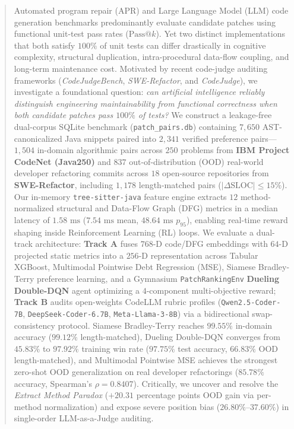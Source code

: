 \documentclass[conference]{IEEEtran}
\begin{document}
\begin{abstract}
Automated program repair (APR) and Large Language Model (LLM) code generation benchmarks predominantly evaluate candidate patches using functional unit-test pass rates ($\text{Pass@}k$). Yet two distinct implementations that both satisfy $100\%$ of unit tests can differ drastically in cognitive complexity, structural duplication, intra-procedural data-flow coupling, and long-term maintenance cost. Motivated by recent code-judge auditing frameworks (\textit{CodeJudgeBench}, \textit{SWE-Refactor}, and \textit{CodeJudge}), we investigate a foundational question: \textit{can artificial intelligence reliably distinguish engineering maintainability from functional correctness when both candidate patches pass $100\%$ of tests?} We construct a leakage-free dual-corpus SQLite benchmark (\texttt{patch\_pairs.db}) containing $7{,}650$ AST-canonicalized Java snippets paired into $2{,}341$ verified preference pairs---$1{,}504$ in-domain algorithmic pairs across $250$ problems from \textbf{IBM Project CodeNet (Java250)} and $837$ out-of-distribution (OOD) real-world developer refactoring commits across $18$ open-source repositories from \textbf{SWE-Refactor}, including $1{,}178$ length-matched pairs ($|\Delta \text{SLOC}| \le 15\%$). Our in-memory \texttt{tree-sitter-java} feature engine extracts $12$ method-normalized structural and Data-Flow Graph (DFG) metrics in a median latency of $1.58\text{ ms}$ ($7.54\text{ ms}$ mean, $48.64\text{ ms}$ $p_{95}$), enabling real-time reward shaping inside Reinforcement Learning (RL) loops. We evaluate a dual-track architecture: \textbf{Track A} fuses $768\text{-D}$ code/DFG embeddings with $64\text{-D}$ projected static metrics into a $256\text{-D}$ representation across Tabular XGBoost, Multimodal Pointwise Debt Regression (MSE), Siamese Bradley-Terry preference learning, and a Gymnasium \texttt{PatchRankingEnv} \textbf{Dueling Double-DQN} agent optimizing a $4$-component multi-objective reward; \textbf{Track B} audits open-weights CodeLLM rubric profiles (\texttt{Qwen2.5-Coder-7B}, \texttt{DeepSeek-Coder-6.7B}, \texttt{Meta-Llama-3-8B}) via a bidirectional swap-consistency protocol. Siamese Bradley-Terry reaches $99.55\%$ in-domain accuracy ($99.12\%$ length-matched), Dueling Double-DQN converges from $45.83\%$ to $97.92\%$ training win rate ($97.75\%$ test accuracy, $66.83\%$ OOD length-matched), and Multimodal Pointwise MSE achieves the strongest zero-shot OOD generalization on real developer refactorings ($85.78\%$ accuracy, Spearman's $\rho = 0.8407$). Critically, we uncover and resolve the \emph{Extract Method Paradox} ($+20.31$ percentage points OOD gain via per-method normalization) and expose severe position bias ($26.80\%\text{--}37.60\%$) in single-order LLM-as-a-Judge auditing.
\end{abstract}
\end{document}
